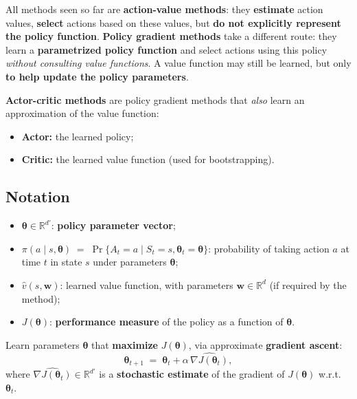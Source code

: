 \documentclass[11pt,a4paper]{article}
\theoremstyle{definition}
\theoremstyle{plain}
\theoremstyle{remark}
\begin{document}
All methods seen so far are \textbf{action-value methods}: they \textbf{estimate} action values, \textbf{select} actions based on these values, but \textbf{do not explicitly represent the policy function}. \textbf{Policy gradient methods} take a different route: they learn a \textbf{parametrized policy function} and select actions using this policy \emph{without consulting value functions}. A value function may still be learned, but only \textbf{to help update the policy parameters}.

\textbf{Actor-critic methods} are policy gradient methods that \emph{also} learn an approximation of the value function:
\begin{itemize}
    \item \textbf{Actor:} the learned policy;
    \item \textbf{Critic:} the learned value function (used for bootstrapping).
\end{itemize}

\subsection*{Notation}

\begin{itemize}
    \item $\boldsymbol{\theta} \in \mathbb{R}^{d'}$: \textbf{policy parameter vector};
    \item $\pi(a \mid s, \boldsymbol{\theta}) \;=\; \Pr\{A_t = a \mid S_t = s, \boldsymbol{\theta}_t = \boldsymbol{\theta}\}$: probability of taking action $a$ at time $t$ in state $s$ under parameters $\boldsymbol{\theta}$;
    \item $\hat{v}(s, \mathbf{w})$: learned value function, with parameters $\mathbf{w} \in \mathbb{R}^d$ (if required by the method);
    \item $J(\boldsymbol{\theta})$: \textbf{performance measure} of the policy as a function of $\boldsymbol{\theta}$.
\end{itemize}

\begin{tcolorbox}[colback=blue!5!white, colframe=blue!60!black, title={Goal of Policy Gradient Methods}]
Learn parameters $\boldsymbol{\theta}$ that \textbf{maximize} $J(\boldsymbol{\theta})$, via approximate \textbf{gradient ascent}:
\[
    \boldsymbol{\theta}_{t+1} \;=\; \boldsymbol{\theta}_t + \alpha\, \widehat{\nabla J(\boldsymbol{\theta}_t)},
\]
where $\widehat{\nabla J(\boldsymbol{\theta}_t)} \in \mathbb{R}^{d'}$ is a \textbf{stochastic estimate} of the gradient of $J(\boldsymbol{\theta})$ w.r.t.\ $\boldsymbol{\theta}_t$.
\end{tcolorbox}
\end{document}
